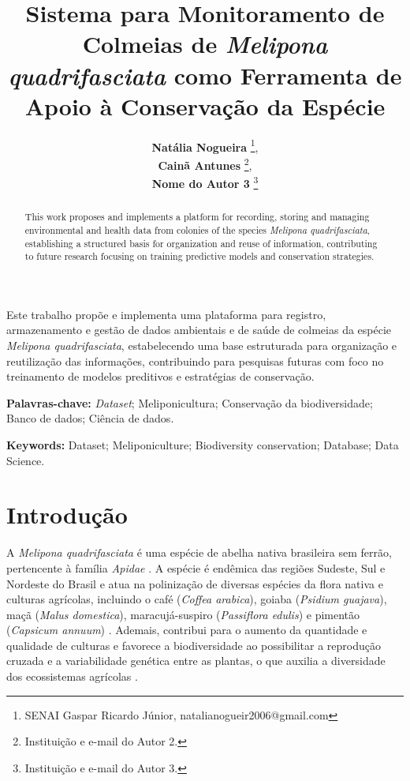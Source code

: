 \documentclass[12pt]{unisenaiclass}
\title{Sistema para Monitoramento de Colmeias de \textit{Melipona quadrifasciata} como Ferramenta de Apoio à Conservação da Espécie}
\subtitle{}
\author{
    \textbf{Natália Nogueira} \thanks{SENAI Gaspar Ricardo Júnior, natalianogueir2006@gmail.com},\\
    \textbf{Cainã Antunes} \thanks{Instituição e e-mail do Autor 2.},\\
    \textbf{Nome do Autor 3} \thanks{Instituição e e-mail do Autor 3.}
}
\begin{document}
\maketitle

\begin{resumo}
Este trabalho propõe e implementa uma plataforma para registro, armazenamento e gestão de dados ambientais e de saúde de colmeias da espécie \textit{Melipona quadrifasciata}, estabelecendo uma base estruturada para organização e reutilização das informações, contribuindo para pesquisas futuras com foco no treinamento de modelos preditivos e estratégias de conservação.
\end{resumo}

\begin{justify}
    \textbf{Palavras-chave:} \textit{Dataset}; Meliponicultura; Conservação da biodiversidade; Banco de dados; Ciência de dados.
\end{justify}

\begin{abstract}
This work proposes and implements a platform for recording, storing and managing environmental and health data from colonies of the species \textit{Melipona quadrifasciata}, establishing a structured basis for organization and reuse of information, contributing to future research focusing on training predictive models and conservation strategies.
\end{abstract}

\begin{justify}
    \textbf{Keywords:} Dataset; Meliponiculture; Biodiversity conservation; Database; Data Science.    
\end{justify}    

\newpage

\section{Introdução}
A \textit{Melipona quadrifasciata} é uma espécie de abelha nativa brasileira sem ferrão, pertencente à família \textit{Apidae} \cite{silveira2002abelhas}. A espécie é endêmica das regiões Sudeste, Sul e Nordeste do Brasil \cite{carvalhozilse2011meliponicultura} e atua na polinização de diversas espécies da flora nativa e culturas agrícolas, incluindo o café (\textit{Coffea arabica}), goiaba (\textit{Psidium guajava}), maçã (\textit{Malus domestica}), maracujá-suspiro (\textit{Passiflora edulis}) e pimentão (\textit{Capsicum annuum}) \cite{wolowski2019polinizacao}. Ademais, contribui para o aumento da quantidade e qualidade de culturas \cite{silva2022meliponicultura} e favorece a biodiversidade ao possibilitar a reprodução cruzada e a variabilidade genética entre as plantas, o que auxilia a diversidade dos ecossistemas agrícolas \cite{calazans2019visitantes}.
\end{document}
